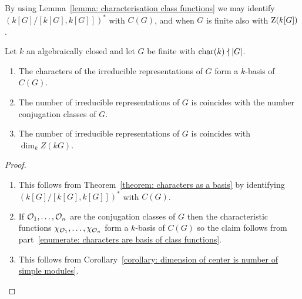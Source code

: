 \begin{fluff}
  By using Lemma~\ref{lemma: characterisation class functions} we may identify $(k[G]/[k[G], k[G]])^*$ with $C(G)$, and when $G$ is finite also with $\operatorname{Z}(k[G])$.
\end{fluff}




\begin{proposition}
  \label{proposition: conjugation classes and irreducible representations}
  Let $k$ an algebraically closed and let $G$ be finite with $\operatorname{char}(k) \nmid |G|$.
  \begin{enumerate}
    \item
      \label{enumerate: characters are basis of class functions}
     The characters of the irreducible representations of $G$ form a $k$-basis of $C(G)$.
    \item
      \label{enumerate: number of irr rep is number of conjugacy classes}
      The number of irreducible representations of $G$ is coincides with the number conjugation classes of $G$.
    \item
      \label{enumerate: number of irr rep is dim of center}
      The number of irreducible representations of $G$ is coincides with $\dim_k Z(kG)$.
  \end{enumerate}
\end{proposition}


\begin{proof}
  \leavevmode
  \begin{enumerate}
    \item
      This follows from Theorem~\ref{theorem: characters as a basis} by identifying $(k[G]/[k[G], k[G]])^*$ with $C(G)$.
    \item
      If $\mathcal{O}_1, \dotsc, \mathcal{O}_n$ are the conjugation classes of $G$ then the characteristic functions $\chi_{\mathcal{O}_1}, \dotsc, \chi_{\mathcal{O}_n}$ form a $k$-basis of $C(G)$ so the claim follows from part~\ref*{enumerate: characters are basis of class functions}.
    \item
      This follows from Corollary~\ref{corollary: dimension of center is number of simple modules}.
    \qedhere
  \end{enumerate}
\end{proof}


